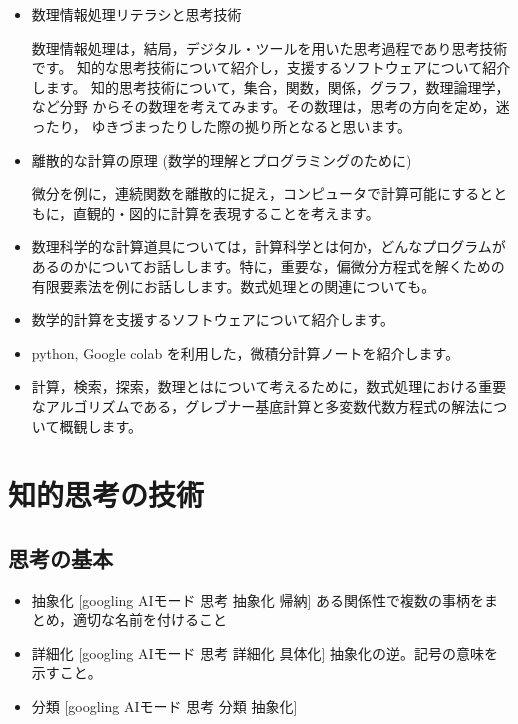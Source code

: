 \documentclass[dvipdfmx,11pat]{jarticle}
\begin{document}
\begin{itemize}
\item 数理情報処理リテラシと思考技術

数理情報処理は，結局，デジタル・ツールを用いた思考過程であり思考技術です。
知的な思考技術について紹介し，支援するソフトウェアについて紹介します。
知的思考技術について，集合，関数，関係，グラフ，数理論理学，など分野
からその数理を考えてみます。その数理は，思考の方向を定め，迷ったり，
ゆきづまったりした際の拠り所となると思います。

\item 離散的な計算の原理 (数学的理解とプログラミングのために)

微分を例に，連続関数を離散的に捉え，コンピュータで計算可能にするとと
もに，直観的・図的に計算を表現することを考えます。

\item 数理科学的な計算道具については，計算科学とは何か，どんなプログラムが
あるのかについてお話しします。特に，重要な，偏微分方程式を解くための
有限要素法を例にお話しします。数式処理との関連についても。

\item 数学的計算を支援するソフトウェアについて紹介します。

\item python, Google colab を利用した，微積分計算ノートを紹介します。

\item 計算，検索，探索，数理とはについて考えるために，数式処理における重要
なアルゴリズムである，グレブナー基底計算と多変数代数方程式の解法につ
いて概観します。
\end{itemize}
\section{知的思考の技術}
\label{sec:org4daad1a}
\subsection{思考の基本}
\label{sec:orgcfded6a}
\begin{itemize}
\item 抽象化 [googling AIモード 思考 抽象化 帰納]
ある関係性で複数の事柄をまとめ，適切な名前を付けること

\item 詳細化 [googling AIモード 思考 詳細化  具体化]
抽象化の逆。記号の意味を示すこと。

\item 分類 [googling AIモード 思考 分類 抽象化]
\end{itemize}
\end{document}
